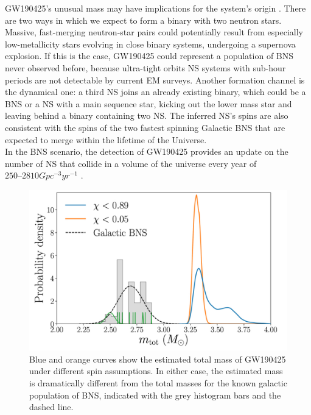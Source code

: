 \documentclass[binding=0.6cm, LaM]{sapthesis}
\begin{document}
	GW190425’s unusual mass may have implications for the system’s origin \cite{148}.
	There are two ways in which we expect to form a binary with two neutron stars. 
	Massive, fast-merging neutron-star pairs could potentially result from 
	especially low-metallicity stars evolving in close binary systems, undergoing a supernova explosion.
	If this is the case, GW190425 could represent a population of BNS never observed before, 
	because ultra-tight orbits NS systems with sub-hour periods are not detectable by current EM surveys.
	Another formation channel is the dynamical one: a third NS joins an already existing binary, 
	which could be a BNS or a NS with a main sequence star, kicking out the
	lower mass star and leaving behind a binary containing two NS.
	The inferred NS’s spins are also consistent with the spins of the two fastest 
	spinning Galactic BNS that are expected to merge within the lifetime of the Universe. \\
	In the BNS scenario, the detection of GW190425 provides an update 
	on the number of NS that collide in a volume of the universe every year of $250–2810 Gpc^{-3}yr^{-1}$ \cite{62}.
		\begin{figure}[H]
                        \label{secondbns}
                        \includegraphics[scale=0.3]{secondbns}
                        \centering
                        \caption{Blue and orange curves show the estimated total mass of GW190425 
				 under different spin assumptions. 
				 In either case, the estimated mass is dramatically different from 
				 the total masses for the known galactic population of BNS, 
				 indicated with the grey histogram bars and the dashed line. \cite{62}}
		        \label{fig:secondbns}
                \end{figure}
\end{document}
